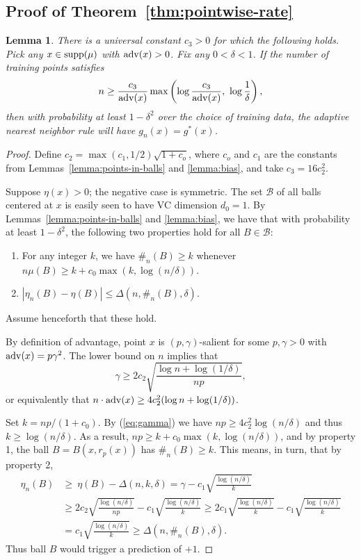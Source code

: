\documentclass{article}
\def\B{{\mathcal B}}
\def\supp{{\rm supp}}
\def\adv{{\rm adv}}
\newtheorem{lemma}[theorem]{Lemma}
\begin{document}
\subsection{Proof of Theorem~\ref{thm:pointwise-rate}}

\begin{lemma}
There is a universal constant $c_3 > 0$ for which the following holds. Pick any $x \in \supp(\mu)$ with $\adv(x) > 0$. Fix any $0 < \delta < 1$. If the number of training points satisfies
$$ n \geq \frac{c_3}{\adv(x)} \max\left(\log \frac{c_3}{\adv(x)}, \ \log \frac{1}{\delta} \right), $$
then with probability at least $1-\delta^2$ over the choice of training data, the adaptive nearest neighbor rule will have $g_n(x) = g^*(x)$.
\label{lemma:pointwise}
\end{lemma}
\begin{proof}
Define $c_2 = \max(c_1, 1/2) \sqrt{1+c_o}$, where $c_o$ and $c_1$ are the constants from Lemmas~\ref{lemma:points-in-balls} and \ref{lemma:bias}, and take $c_3 = 16 c_2^2$.

Suppose $\eta(x) > 0$; the negative case is symmetric. The set $\B$ of all balls centered at $x$ is easily seen to have VC dimension $d_0 = 1$. By Lemmas~\ref{lemma:points-in-balls} and \ref{lemma:bias}, we have that with probability at least $1-\delta^2$, the following two properties hold for all $B \in \B$:
\begin{enumerate}
\item For any integer $k$, we have $\#_n(B) \geq k$ whenever $n \mu(B) \geq k + c_0 \max(k, \log (n/\delta))$.
\item $|\eta_n(B) - \eta(B)| \leq \Delta(n, \#_n(B), \delta)$.
\end{enumerate}
Assume henceforth that these hold.

By definition of advantage, point $x$ is $(p,\gamma)$-salient for some $p,\gamma> 0$ with $\adv(x) = p\gamma^2$. The lower bound on $n$ implies that
\begin{equation}
\gamma \geq 2c_2 \sqrt{\frac{\log n + \log (1/\delta)}{np}} ,
\label{eq:gamma}
\end{equation}
or equivalently that $n \cdot \adv(x) \geq 4c_2^2 (\log n + \log (1/\delta))$.

Set $k = np/(1 + c_0)$. By (\ref{eq:gamma}) we have $np \geq 4 c_2^2 \log (n/\delta)$ and thus $k \geq \log (n/\delta)$. As a result, $np \geq k + c_0 \max(k, \log (n/\delta))$, and by property 1, the ball $B = B(x, r_p(x))$ has $\#_n(B) \geq k$. This means, in turn, that by property 2,
\begin{align*}
\eta_n(B) &\geq \ \eta(B) - \Delta(n, k, \delta)
= \gamma - c_1 \sqrt{\frac{\log (n/\delta)}{k}} \\
&\geq 2c_2 \sqrt{\frac{\log (n/\delta)}{np}} - c_1 \sqrt{\frac{\log (n/\delta)}{k}}
\geq 2c_1 \sqrt{\frac{\log (n/\delta)}{k}} - c_1 \sqrt{\frac{\log (n/\delta)}{k}} \\
&= c_1 \sqrt{\frac{\log (n/\delta)}{k}} \geq \Delta(n, \#_n(B), \delta) .
\end{align*}
Thus ball $B$ would trigger a prediction of $+1$.


\end{proof}
\end{document}
